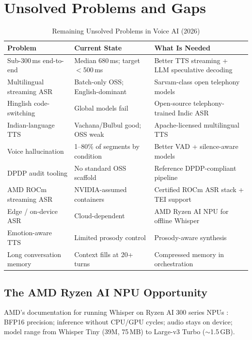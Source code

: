 \documentclass[12pt,a4paper]{article}
\begin{document}
\section{Unsolved Problems and Gaps}
\label{sec:gaps}

\begin{table}[H]\centering
\caption{Remaining Unsolved Problems in Voice AI (2026)}
\label{tab:gaps}
\small
\begin{tabularx}{\textwidth}{L{3.0cm}L{3.6cm}X}
\toprule
\textbf{Problem} & \textbf{Current State} & \textbf{What Is Needed} \\
\midrule
Sub-300\,ms end-to-end    & Median 680\,ms; target $<$500\,ms  & Better TTS streaming + LLM speculative decoding \\
Multilingual streaming ASR& Batch-only OSS; English-dominant   & Sarvam-class open telephony models \\
Hinglish code-switching   & Global models fail                 & Open-source telephony-trained Indic ASR \\
Indian-language TTS       & Vachana/Bulbul good; OSS weak      & Apache-licensed multilingual TTS \\
Voice hallucination       & 1--80\% of segments by condition   & Better VAD + silence-aware models \\
DPDP audit tooling        & No standard OSS scaffold           & Reference DPDP-compliant pipeline \\
AMD ROCm streaming ASR    & NVIDIA-assumed containers          & Certified ROCm ASR stack + TEI support \\
Edge / on-device ASR      & Cloud-dependent                    & AMD Ryzen AI NPU for offline Whisper \\
Emotion-aware TTS         & Limited prosody control            & Prosody-aware synthesis \\
Long conversation memory  & Context fills at 20+ turns         & Compressed memory in orchestration \\
\bottomrule
\end{tabularx}
\end{table}

\subsection{The AMD Ryzen AI NPU Opportunity}

AMD's documentation for running Whisper on Ryzen AI 300 series NPUs
\cite{amd-npu-whisper}: BFP16 precision; inference without CPU/GPU cycles;
audio stays on device; model range from Whisper Tiny (39M, 75\,MB) to
Large-v3 Turbo ($\sim$1.5\,GB).
\end{document}
